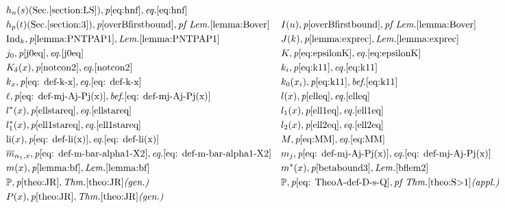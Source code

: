 \documentclass[12pt]{amsart}
\begin{document}
{\begin{align*}
    &h_n(s)\text{(Sec.\ref{section:LS})},\textit{p}\pageref{eq:hnf},\textit{eq.}\eqref{eq:hnf}\\
    &h_p(t) \text{(Sec.\ref{section:3})},\textit{p}\pageref{overBfirstbound}, \textit{pf Lem.} \ref{lemma:Bover}&
    &I(u),\textit{p}\pageref{overBfirstbound},\textit{pf Lem.} \ref{lemma:Bover}\\
    &\textnormal{Ind}_k,\textit{p}\pageref{lemma:PNTPAP1},\textit{Lem.} \ref{lemma:PNTPAP1}&
    &J(k),\textit{p}\pageref{lemma:exprec},\textit{Lem.} \ref{lemma:exprec}\\
    &j_0,\textit{p}\pageref{j0eq},\textit{eq.}\eqref{j0eq}&
    &K,\textit{p}\pageref{eq:epsilonK},\textit{eq.}\eqref{eq:epsilonK}\\
    &K_{\delta}(x),\textit{p}\pageref{notcon2},\textit{eq.}\eqref{notcon2}&
    &k_i,\textit{p}\pageref{eq:k11},\textit{eq.}\eqref{eq:k11}\\
    &k_{x},\textit{p}\pageref{eq: def-k-x},\textit{eq.}\eqref{eq: def-k-x}&
    &k_0(x_i),\textit{p}\pageref{eq:k11}, \textit{bef.} \eqref{eq:k11}\\
    &\ell,\textit{p}\pageref{eq: def-mj-Aj-Pj(x)}, \textit{bef.} \eqref{eq: def-mj-Aj-Pj(x)}&
    &l(x),\textit{p}\pageref{elleq},\textit{eq.}\eqref{elleq}\\
    &l^*(x),\textit{p}\pageref{ellstareq},\textit{eq.}\eqref{ellstareq}&
    &l_1(x),\textit{p}\pageref{ell1eq},\textit{eq.}\eqref{ell1eq}\\
    &l^*_1(x),\textit{p}\pageref{ell1stareq},\textit{eq.}\eqref{ell1stareq}&
    &l_2(x),\textit{p}\pageref{ell2eq},\textit{eq.}\eqref{ell2eq}\\
    &\text{li}(x),\textit{p}\pageref{eq: def-li(x)},\textit{eq.}\eqref{eq: def-li(x)}&
    &M,\textit{p}\pageref{eq:MM},\textit{eq.}\eqref{eq:MM}\\
    &\overline{m}_{\alpha_1,x},\textit{p}\pageref{eq: def-m-bar-alpha1-X2},\textit{eq.}\eqref{eq: def-m-bar-alpha1-X2}&
    &m_j,\textit{p}\pageref{eq: def-mj-Aj-Pj(x)},\textit{eq.}\eqref{eq: def-mj-Aj-Pj(x)}\\
    &m(x),\textit{p}\pageref{lemma:bf}, \textit{Lem.} \ref{lemma:bf}&
    &m^*(x),\textit{p}\pageref{betabound3}, \textit{Lem.} \ref{bflem2}\\
    &\mathbb{P},\textit{p}\pageref{theo:JR},\textit{Thm.} \ref{theo:JR} \textit{(gen.)}&
    &\mathbb{P},\textit{p}\pageref{eq: TheoA-def-D-s-Q},\textit{pf Thm.} \ref{theo:S>1}\textit{(appl.)}\\
    &P(x),\textit{p}\pageref{theo:JR},\textit{Thm.} \ref{theo:JR} \textit{(gen.)}&

\end{align*}}
\end{document}
